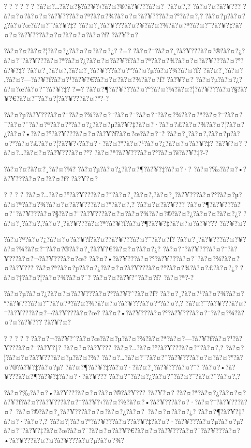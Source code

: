 \documentclass[11pt, openany]{book}
\begin{document}
{{{{{{{{{{{{{{{{{? ? ? ? ? ? ?à?¤?\ldots{}?à?¤?§?à?¥?‹?à?¤?®?à?¥???à?¤?--?à?¤?‚?
?à?¤?¤?à?¥??? ?à?¤?¤?à?¤?¤?à?¥???à?¤?ª?à?¤?¾?à?¤?¤?à?¥???à?¤?°?à?¤?‚?
?à?¤?µ?à?¤?¿?à?¤?œ?à?¤?¨?à?¥?‡?
?à?¤?¸?à?¥???à?¤?¥?à?¤?¾?à?¤?ª?à?¤?¯?à?¥?‡?à?¤?¤?à?¥???à?¤?¤?à?¤?¤?à?¤?ƒ?
?à?¥?¤?

?à?¤?¤?à?¤?¦?à?¤?¿?à?¤?¤?à?¤?¿? ?=?
?à?¤?¯?à?¤?¸?à?¥???à?¤?®?à?¤?¿?à?¤?¨?à?¥???à?¤?ª?à?¤?¿?à?¤?¤?à?¥?ƒ?à?¤?ª?à?¤?¾?à?¤?¤?à?¥???à?¤?°?à?¥?‡?
?à?¤?¸?à?¤?‚?à?¤?¸?à?¥???à?¤?°?à?¤?µ?à?¤?¾?à?¤?ƒ?
?à?¤?¸?à?¤?‚?à?¤?---?à?¥?ƒ?à?¤?¹?à?¥?€?à?¤?¤?à?¤?¾?à?¤?ƒ? ?à?¥?¤?
?à?¤?µ?à?¤?¿?à?¤?œ?à?¤?¨?à?¥?‡? ?=?
?à?¤?¶?à?¥???à?¤?°?à?¤?¾?à?¤?¦?à?¥???à?¤?§?à?¥?€?à?¤?¯?à?¤?¦?à?¥???à?¤?°?-?

?à?¤?µ?à?¥???à?¤?¯?à?¤?¾?à?¤?¨?à?¤?¯?à?¤?¨?à?¤?¾?à?¤?ª?à?¤?¨?à?¤?¯?à?¤?¨?à?¤?ª?à?¤?°?à?¤?¿?à?¤?µ?à?¥?‡?à?¤?·?à?¤?£?à?¤?¾?à?¤?¦?à?¤?¿?à?¤?•?à?¤?°?à?¥???à?¤?¤?à?¥?ƒ?à?¤?œ?à?¤?¨?
?à?¤?¸?à?¤?‚?à?¤?µ?à?¤?°?à?¤?£?à?¤?¦?à?¥?‹?à?¤?·?à?¤?°?à?¤?¹?à?¤?¿?à?¤?¤?à?¥?‡?
?à?¥?¤? ?à?¤?\ldots{}?à?¤?¤?à?¥???à?¤?°?
?à?¤?ª?à?¥???à?¤?°?à?¤?š?à?¥?‡?-?

?à?¤?¤?à?¤?¸?à?¤?¾? ?à?¤?µ?à?¤?¿?à?¤?¶?à?¥?‡?à?¤?·?
?à?¤?‰?à?¤?•?à?¥???à?¤?¤?à?¤?ƒ? ?à?¥?¤?

? ? ? ?
?à?¤?\ldots{}?à?¤?°?à?¥???à?¤?˜?à?¤?¸?à?¤?‚?à?¤?¸?à?¥???à?¤?°?à?¤?µ?à?¤?ª?à?¤?¾?à?¤?¤?à?¥???à?¤?°?à?¤?‚?
?à?¤?¤?à?¥???
?à?¤?¶?à?¥???à?¤?¨?à?¥???à?¤?§?à?¤?¨?à?¥???à?¤?¤?à?¤?¾?à?¤?®?à?¤?¿?à?¤?¤?à?¤?¿?
?à?¤?¸?à?¤?‚?à?¤?¸?à?¥???à?¤?ª?à?¥?ƒ?à?¤?¶?à?¥?‡?à?¤?¤?à?¥??? ?à?¥?¤?

?à?¤?ª?à?¤?¿?à?¤?¤?à?¥?ƒ?à?¤?­?à?¥???à?¤?¯?à?¤?ƒ?
?à?¤?¸?à?¥???à?¤?¥?à?¤?¾?à?¤?¨?à?¤?®?à?¤?¸?à?¥?€?à?¤?¤?à?¤?¿?
?à?¤?¨?à?¥???à?¤?¯?à?¥???à?¤?¬?à?¥???à?¤?œ?
?à?¤?•?à?¥???à?¤?°?à?¥???à?¤?¯?à?¤?¾?à?¤?¤?à?¥???
?à?¤?ª?à?¤?µ?à?¤?¿?à?¤?¤?à?¥???à?¤?°?à?¤?¾?à?¤?£?à?¤?¿?
?à?¤?†?à?¤?¦?à?¤?¾?à?¤?¯? ?à?¤?¤?à?¥?ˆ?à?¤?ƒ? ?à?¤?ª?-?

?à?¤?µ?à?¤?¿?à?¤?¤?à?¥???à?¤?°?à?¥?ˆ?à?¤?ƒ?
?à?¤?¸?à?¤?¹?à?¤?¾?à?¤?°?à?¥???à?¤?˜?à?¤?ª?à?¤?¾?à?¤?¤?à?¥???à?¤?°?à?¤?‚?
?à?¤?¨?à?¥???à?¤?¯?à?¥???à?¤?¬?à?¥???à?¤?œ?
?à?¤?•?à?¥???à?¤?°?à?¥???à?¤?¯?à?¤?¾?à?¤?¤?à?¥??? ?à?¥?¤?

? ? ? ? ?
?à?¤?¬?à?¥?ˆ?à?¤?œ?à?¤?µ?à?¤?¾?à?¤?ª?à?¤?---?à?¥?ƒ?à?¤?¹?à?¥???à?¤?¯?à?¥?‡?
?à?¤?¤?à?¥??? ?à?¤?\ldots{}?à?¤?°?à?¥???à?¤?˜?à?¤?‚?
?à?¤?¦?à?¤?¤?à?¥???à?¤?µ?à?¤?¾?
?à?¤?\ldots{}?à?¤?¨?à?¤?¨?à?¥???à?¤?¤?à?¤?°?à?¤?®?à?¥?‡?à?¤?µ?
?à?¤?¶?à?¥?‡?à?¤?·?à?¤?¸?à?¥???à?¤?¯?
?à?¤?•?à?¥???à?¤?¶?à?¥?‡?à?¤?·?à?¥???
?à?¤?¨?à?¤?¿?à?¤?¨?à?¤?¯?à?¤?¨?à?¤?‚?

?à?¤?‰?à?¤?•?à?¥???à?¤?¤?à?¤?®?à?¥??? ?à?¥?¤?
?à?¤?ª?à?¤?¿?à?¤?¤?à?¥?ƒ?à?¤?­?à?¥???à?¤?¯?à?¥?‹?à?¤?½?à?¤?•?à?¥???à?¤?·?à?¤?¯?à?¥???à?¤?¯?à?¤?®?à?¤?¸?à?¥???à?¤?¤?à?¤?¿?à?¤?¯?à?¤?¤?à?¤?¿?
?à?¤?¶?à?¥?‡?à?¤?·?à?¤?‚?
?à?¤?¦?à?¤?°?à?¥???à?¤?­?à?¥?‡?à?¤?·?à?¥???à?¤?µ?à?¤?µ?à?¤?¨?à?¥?‡?à?¤?œ?à?¤?¯?à?¤?¤?à?¥?€?à?¤?¤?à?¥???à?¤?¯?à?¥???à?¤?•?à?¥???à?¤?¤?à?¥???à?¤?µ?à?¤?¾?

}}}}}}}}}}}}}}}}}
\end{document}

